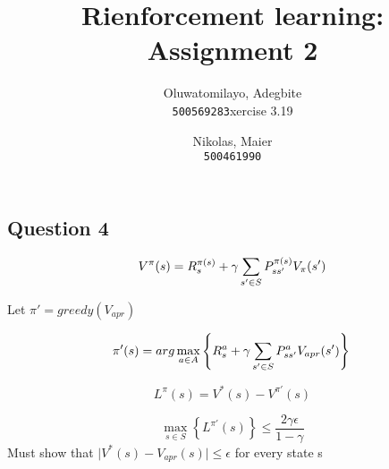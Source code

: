 \documentclass[12pt]{extarticle}
\title{Rienforcement learning: Assignment 2}
\author{
  Oluwatomilayo, Adegbite\\
  \texttt{500569283}xercise 3.19
  \and
  Nikolas, Maier\\
  \texttt{500461990}
}
\newcommand{\<}{\langle}
\renewcommand{\>}{\rangle}
\theoremstyle{definition}
\begin{document}
\maketitle

\section{}

\subsection{Question 4} 


 \begin{equation}
V^\pi(s) = R_s^{\pi (s)} + \gamma \sum_{s' \in S}  P_{s s'}^{ \pi (s)} V_\pi(s') \\ 
\end{equation} 

Let $\pi' = greedy(V_{apr})$

 \begin{equation}
\pi'(s) = arg \max_{a \in A} \left\{ R_s^{a} + \gamma \sum_{s' \in S}  P_{s s'}^{a} V_{apr}(s')\right\} \\ 
\end{equation} 

 \begin{equation}
L^\pi(s) = V^*(s) - V^{\pi'}(s)
\end{equation} 

 \begin{equation}
 \max_{s \in S} \left\{ L^{\pi'}(s) \right\} \leq\dfrac{ 2\gamma \epsilon}{1 - \gamma}
\end{equation} 
Must show that $ \mid V^*(s) - V_{apr}(s) \mid \leq  \epsilon $ for every state s
\end{document}
